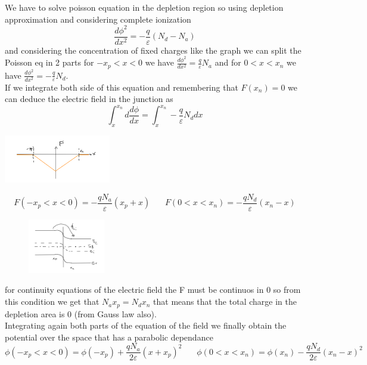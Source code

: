 We have to solve poisson equation in the depletion region so using depletion approximation and considering complete ionization
\begin{equation}
\frac{d\phi^2}{dx^2}=-\frac{q}{\varepsilon}(N_d-N_a)
\end{equation} 
and considering the concentration of fixed charges like the graph we can split the Poisson eq in 2 parts for $-x_p<x<0$ we have $\frac{d\phi^2}{dx^2}=\frac{q}{\varepsilon}N_a$ and for $0<x<x_n$ we have $\frac{d\phi^2}{dx^2}=-\frac{q}{\varepsilon}N_d$.\\
If we integrate both side of this equation and remembering that $F(x_n)=0$ we can deduce the electric field in the junction as 
\begin{equation}
\int^{x_n}_{x} d\frac{d\phi}{dx}=\int^{x_n}_{x}-\frac{q}{\varepsilon}N_d dx
\end{equation}

\centering
\includegraphics[width=0.35\textwidth]{pn4.png}\\
\raggedright

\begin{equation}
F(-x_p<x<0)=-\frac{qN_a}{\varepsilon}(x_p+x)\ \ \ \ \ \ \ \ F(0<x<x_n)=-\frac{qN_d}{\varepsilon}(x_n-x)
\end{equation}

\begin{figure}
\includegraphics[width=0.3\textwidth]{pn5.png}
\end{figure}

for continuity equations of the electric field the F must be continuos in 0 so from this condition we get that $N_ax_p=N_dx_n$ that means that the total charge in the depletion area is 0 (from Gauss law also).\\
Integrating again both parts of the equation of the field we finally obtain the potential over the space that has a parabolic dependance
\begin{equation}
\phi(-x_p<x<0)=\phi(-x_p)+\frac{qN_a}{2\varepsilon}(x+x_p)^2 \ \ \ \ \ \ \ \ \phi(0<x<x_n)=\phi(x_n)-\frac{qN_d}{2\varepsilon}(x_n-x)^2
\end{equation}


